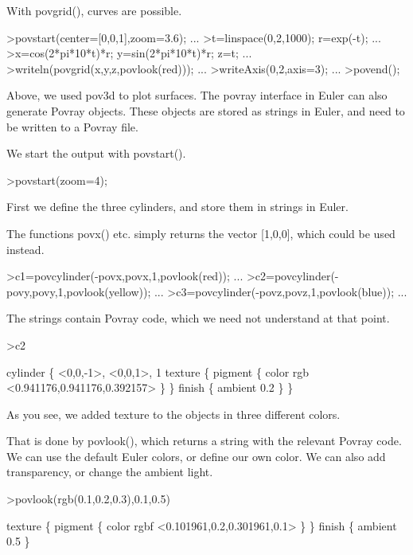 \documentclass[a4paper,10pt]{article}
\begin{document}
\begin{eulernotebook}
\begin{eulerprompt}
\end{eulerprompt}
\begin{eulercomment}
With povgrid(), curves are possible.
\end{eulercomment}
\begin{eulerprompt}
>povstart(center=[0,0,1],zoom=3.6); ...
>t=linspace(0,2,1000); r=exp(-t); ...
>x=cos(2*pi*10*t)*r; y=sin(2*pi*10*t)*r; z=t; ...
>writeln(povgrid(x,y,z,povlook(red))); ...
>writeAxis(0,2,axis=3); ...
>povend();
\end{eulerprompt}
\begin{eulercomment}
Above, we used pov3d to plot surfaces. The povray interface in Euler can also generate Povray objects. These objects are
stored as strings in Euler, and need to be written to a Povray file.

We start the output with povstart().
\end{eulercomment}
\begin{eulerprompt}
>povstart(zoom=4);
\end{eulerprompt}
\begin{eulercomment}
First we define the three cylinders, and store them in strings in Euler.

The functions povx() etc. simply returns the vector [1,0,0], which could be used instead.
\end{eulercomment}
\begin{eulerprompt}
>c1=povcylinder(-povx,povx,1,povlook(red)); ...
>c2=povcylinder(-povy,povy,1,povlook(yellow)); ...
>c3=povcylinder(-povz,povz,1,povlook(blue)); ...
\end{eulerprompt}
\begin{eulercomment}
The strings contain Povray code, which we need not understand at that
point.
\end{eulercomment}
\begin{eulerprompt}
>c2
\end{eulerprompt}
\begin{euleroutput}
  cylinder \{ <0,0,-1>, <0,0,1>, 1
   texture \{ pigment \{ color rgb <0.941176,0.941176,0.392157> \}  \} 
   finish \{ ambient 0.2 \} 
   \}
\end{euleroutput}
\begin{eulercomment}
As you see, we added texture to the objects in three different colors.

That is done by povlook(), which returns a string with the relevant
Povray code. We can use the default Euler colors, or define our own
color. We can also add transparency, or change the ambient light.
\end{eulercomment}
\begin{eulerprompt}
>povlook(rgb(0.1,0.2,0.3),0.1,0.5)
\end{eulerprompt}
\begin{euleroutput}
   texture \{ pigment \{ color rgbf <0.101961,0.2,0.301961,0.1> \}  \} 
   finish \{ ambient 0.5 \} 
  

\end{euleroutput}
\end{eulernotebook}
\end{document}

